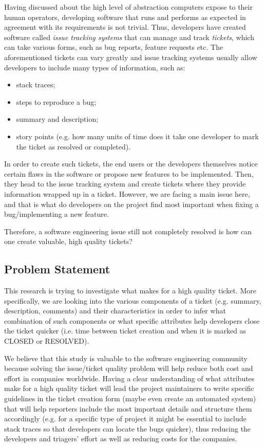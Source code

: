\documentclass{mprop}
\begin{document}
Having discussed about the high level of abstraction computers expose to 
their human operators, developing software that runs and performs as expected
in agreement with its requirements is not trivial. Thus, developers have
created software called \emph{issue tracking systems} that can manage
and track \emph{tickets}, which can take various forms, such as bug 
reports, feature requests etc. The aforementioned tickets can vary greatly
and issue tracking systems usually allow developers to include many 
types of information, such as:
  \begin{itemize}
    \item stack traces;
    \item steps to reproduce a bug;
    \item summary and description;
    \item story points (e.g. how many units of time does it take one
      developer to mark the ticket as resolved or completed).
  \end{itemize}
In order to create such tickets, the end users or the developers 
themselves notice certain flaws in the software or propose new features
to be implemented. Then, they head to the issue tracking system and 
create tickets where they provide information wrapped up in a ticket.
However, we are facing a main issue here, and that is what do developers 
on the project find most important when fixing a bug/implementing a 
new feature.

Therefore, a software engineering issue still not completely resolved
is how can one create valuable, high quality tickets?

\subsection{Problem Statement}

This research is trying to investigate what makes for a high quality 
ticket. More specifically, we are looking into the various components 
of a ticket (e.g. summary, description, comments) and their characteristics
in order to infer what combination of such components or what specific
attributes help developers close the ticket quicker (i.e. time between
ticket creation and when it is marked as CLOSED or RESOLVED). 

We believe that this study is valuable to the software engineering 
community because solving the issue/ticket quality problem will help
reduce both cost and effort in companies worldwide. 
Having a clear understanding of what attributes make for 
a high quality ticket will lead the project maintainers to write  
specific guidelines in the ticket creation form (maybe even create an 
automated system) that will help reporters include the most
important details and structure them accordingly (e.g. for a specific
type of project it might be essential to include stack traces so that
developers can locate the bugs quicker), thus reducing the developers
and triagers' effort as well as reducing costs for the companies. 
\end{document}
